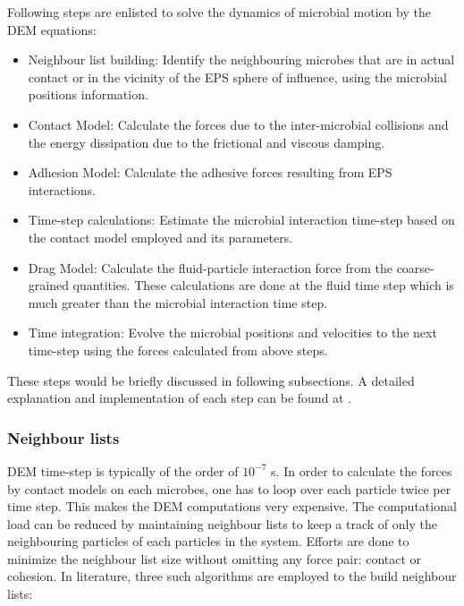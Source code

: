 \documentclass[11pt,a4paper,openright]{article}
\begin{document}
Following steps are enlisted to solve the dynamics of microbial motion by the DEM equations:

\begin{itemize}
\item Neighbour list building: Identify the neighbouring microbes that are in actual contact or in the vicinity of the EPS  sphere of influence, using the microbial positions information.
\item Contact Model: Calculate the forces due to the inter-microbial collisions and the energy dissipation due to the frictional and viscous damping. 
\item Adhesion Model: Calculate the adhesive forces resulting from EPS interactions.
\item Time-step calculations: Estimate the microbial interaction time-step based on the contact model employed and its parameters. 
\item Drag Model: Calculate the fluid-particle interaction force from the coarse-grained quantities. These calculations are done at the fluid time step which is much greater than the microbial interaction time step. 
\item Time integration: Evolve the microbial positions and velocities to the next time-step using the forces calculated from above steps. 
\end{itemize}

These steps would be briefly discussed in following subsections. A detailed explanation and implementation of each step can be found at \citet{plimpton2005lammps}.

\subsubsection{Neighbour lists}
DEM time-step is typically of the order of $10^{-7}$ s. In order to calculate the forces by contact models on each microbes, one has to loop over each particle twice per time step. This makes the DEM computations very expensive. The computational load can be reduced by maintaining neighbour lists to keep a track of only the neighbouring particles of each particles in the system.  Efforts are done to minimize the neighbour list size without omitting any force pair: contact or cohesion. In literature, three such algorithms are employed to the build neighbour lists:
\end{document}
